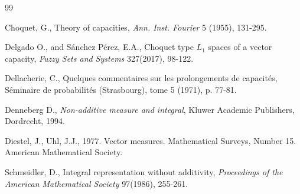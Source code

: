 \documentclass[preprint,authoryear,12pt]{article}%
\theoremstyle{definition}
\begin{document}
\nocite{}

\begin{thebibliography}{99}

 Choquet, G., Theory of capacities, \emph{Ann. Inst. Fourier} 5 (1955), 131-295.

 Delgado O., and S\'anchez P\'erez, E.A., Choquet type $ L_1$ spaces of a vector capacity, \emph{Fuzzy Sets and Systems}  327(2017), 98-122.

 Dellacherie, C.,  Quelques commentaires sur les prolongements de capacit\'es, S\'eminaire de probabilit\'es (Strasbourg), tome 5 (1971), p. 77-81.


 Denneberg D., \emph{Non-additive measure and integral}, Kluwer Academic Publishers, Dordrecht, 1994.

 Diestel, J., Uhl, J.J., 1977. Vector measures. Mathematical Surveys, Number 15. American Mathematical Society.


 Schmeidler, D., Integral representation without additivity, \emph{Proceedings of the American Mathematical Society} 97(1986), 255-261.
\end{thebibliography}
\end{document}
